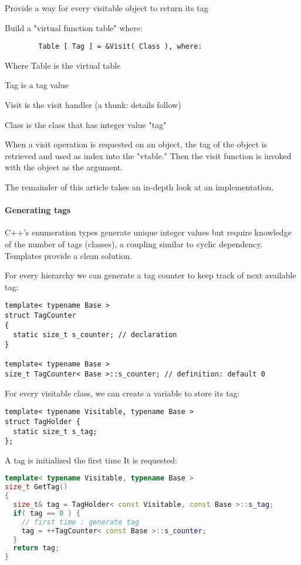 \documentclass{book}
\begin{document}
    Provide a way for every visitable object to return its tag

    Build a "virtual function table" where:
\begin{verbatim}
        Table [ Tag ] = &Visit( Class ), where:
\end{verbatim}

            Where Table is the virtual table

            Tag is a tag value

            Visit is the visit handler (a thunk: details follow)

            Class is the class that has integer value "tag"

    When a visit operation is requested on an object, the tag of the object is retrieved and used as index into the "vtable." Then the visit function is invoked with the object as the argument.

The remainder of this article takes an in-depth look at an implementation.
\paragraph{Generating tags}

C++'s enumeration types generate unique integer values but require knowledge of the number of tags (classes), a coupling similar to cyclic dependency. Templates provide a clean solution.

For every hierarchy we can generate a tag counter to keep track of next available tag:
\begin{verbatim}
template< typename Base >
struct TagCounter
{
  static size_t s_counter; // declaration
}

template< typename Base >
size_t TagCounter< Base >::s_counter; // definition: default 0
\end{verbatim}
For every visitable class, we can create a variable to store its tag:
\begin{verbatim}
template< typename Visitable, typename Base >
struct TagHolder {
  static size_t s_tag;
};
\end{verbatim}

A tag is initialized the first time It is requested:

\begin{lstlisting}[caption={visitor pattern sample code 6-5},language=C++]
template< typename Visitable, typename Base >
size_t GetTag()
{
  size_t& tag = TagHolder< const Visitable, const Base >::s_tag;
  if( tag == 0 ) {
    // first time : generate tag
    tag = ++TagCounter< const Base >::s_counter;
  }
  return tag;
}
\end{lstlisting}
\end{document}
